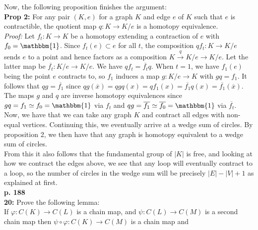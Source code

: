 \documentclass[a4paper]{article}
\begin{document}
    \linebreak
    Now, the following proposition finishes the argument:\\
    \textbf{Prop 2:} For any pair $(K, e)$ for a graph $K$ and edge
    $e$ of $K$ such that $e$ is contractible, the quotient map
    $q  \colon K \to K /e$ is a homotopy equivalence.\\
    \linebreak
    \textit{Proof:} 
    Let $f_t  \colon K \to K$ be a homotopy extending a contraction of
    $e$ with $f_0 = \mathbbm{1}$. Since
    $f_t (e) \subset e$ for all $t$, the composition
    $q f_t  \colon K \to K /e$ sends $e$ to a point and hence
    factors as a composition
    $K \stackrel{q}{\to } K /e \to  K /e$. Let the latter map
    be $\overline{f_t}  \colon K /e \to K /e$. We have
    $q f_t = \overline{f_t} q$. When
    $t = 1$, we have $f_1 (e)$ being the point $e$ contracts to, so
    $f_1$ induces a map $g  \colon K /e \to K$ with
    $g q = f_1$. It follows that
    $qg = \overline{f_1}$ since
    $qg (\overline{x}) = 
    qgq (x) = q f_1(x) = \overline{f_1}q(x) = \overline{f_1}(
    \overline{x})$. The maps
    $g$ and $q$ are inverse homotopy equivalences
    since $gq = f_1 \simeq f_0 = \mathbbm{1}$ via
    $f_t$ and $qg = \overline{f_1}
    \simeq \overline{f_0} = \mathbbm{1}$ via
    $\overline{f_t}$.\\
    \linebreak
    Now, we have that we can take any graph
    $K$ and contract all edges with non-equal vertices. Continuing this, we
    eventually arrive at a wedge sum of circles. By
    proposition 2, we then have that any graph is homotopy
    equivalent to a wedge sum of circles.\\
    \linebreak
    From this it also follows that the fundamental group
    of $\left| K \right| $ is free, and looking at how we contract the edges
    above, we see that any loop will eventually contract to a loop, so
    the number of circles in the wedge sum will be precisely
    $\left| E \right| - \left| V \right| +1$ as explained at first.\\
    \linebreak
    \textbf{p. 188}\\
    \textbf{20:} Prove the following lemma:\\
    If $\varphi  \colon C(K) \to C(L)$ is a chain map,
    and $\psi  \colon C(L) \to C(M)$ is a second chain map then
    $\psi \circ \varphi  \colon C(K) \to C(M)$ is a chain map and
\end{document}
